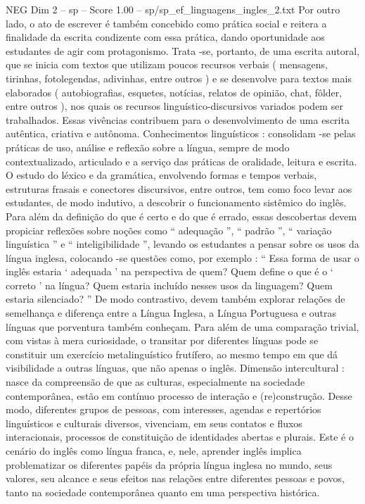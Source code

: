 \begin{textsample}{NEG Dim 2 – sp – Score 1.00 – sp/sp\_ef\_linguagens\_ingles\_2.txt}
Por outro lado, o ato de escrever é também concebido como prática social e reitera a finalidade da escrita condizente com essa prática, dando oportunidade aos estudantes de agir com protagonismo.
Trata -se, portanto, de uma escrita autoral, que se inicia com textos que utilizam poucos recursos verbais ( mensagens, tirinhas, fotolegendas, adivinhas, entre outros ) e se desenvolve para textos mais elaborados ( autobiografias, esquetes, notícias, relatos de opinião, chat, fôlder, entre outros ), nos quais os recursos linguístico-discursivos variados podem ser trabalhados.
Essas vivências contribuem para o desenvolvimento de uma escrita autêntica, criativa e autônoma.
Conhecimentos linguísticos : consolidam -se pelas práticas de uso, análise e reflexão sobre a língua, sempre de modo contextualizado, articulado e a serviço das práticas de oralidade, leitura e escrita.
O estudo do léxico e da gramática, envolvendo formas e tempos verbais, estruturas frasais e conectores discursivos, entre outros, tem como foco levar aos estudantes, de modo indutivo, a descobrir o funcionamento sistêmico do inglês.
Para além da definição do que é certo e do que é errado, essas descobertas devem propiciar reflexões sobre noções como “ adequação ”, “ padrão ”, “ variação linguística ” e “ inteligibilidade ”, levando os estudantes a pensar sobre os usos da língua inglesa, colocando -se questões como, por exemplo : “ Essa forma de usar o inglês estaria ‘ adequada ’ na perspectiva de quem?
Quem define o que é o ‘ correto ’ na língua?
Quem estaria incluído nesses usos da linguagem?
Quem estaria silenciado? ” De modo contrastivo, devem também explorar relações de semelhança e diferença entre a Língua Inglesa, a Língua Portuguesa e outras línguas que porventura também conheçam.
Para além de uma comparação trivial, com vistas à mera curiosidade, o transitar por diferentes línguas pode se constituir um exercício metalinguístico frutífero, ao mesmo tempo em que dá visibilidade a outras línguas, que não apenas o inglês.
Dimensão intercultural : nasce da compreensão de que as culturas, especialmente na sociedade contemporânea, estão em contínuo processo de interação e (re)construção.
Desse modo, diferentes grupos de pessoas, com interesses, agendas e repertórios linguísticos e culturais diversos, vivenciam, em seus contatos e fluxos interacionais, processos de constituição de identidades abertas e plurais.
Este é o cenário do inglês como língua franca, e, nele, aprender inglês implica problematizar os diferentes papéis da própria língua inglesa no mundo, seus valores, seu alcance e seus efeitos nas relações entre diferentes pessoas e povos, tanto na sociedade contemporânea quanto em uma perspectiva histórica.

\end{textsample}
